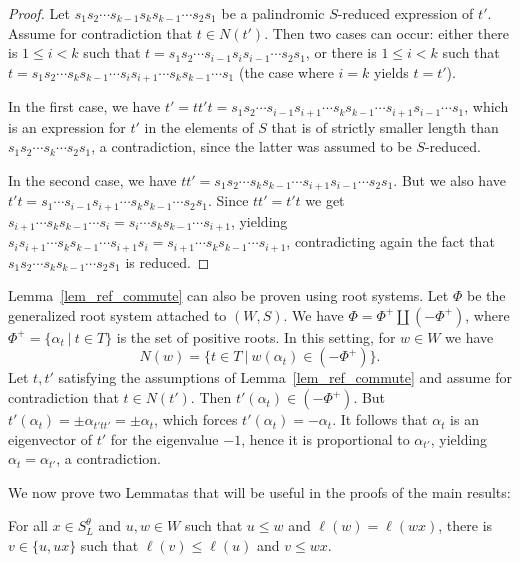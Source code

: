 \documentclass[ALCO, Unicode]{cedram}
\begin{document}
\begin{proof}
	Let $s_1 s_2 \cdots s_{k-1} s_k s_{k-1}\cdots s_2 s_1$ be a palindromic $S$-reduced expression of $t'$. Assume for contradiction that $t\in N(t')$. Then two cases can occur: either there is $1\leq i < k$ such that $t=s_1 s_2 \cdots s_{i-1} s_i s_{i-1}\cdots s_2 s_1$, or there is $1 \leq i < k$ such that $t= s_1 s_2 \cdots s_k s_{k-1} \cdots s_i s_{i+1} \cdots s_k s_{k-1} \cdots s_1$ (the case where $i=k$ yields $t=t'$).
	
	In the first case, we have $t'=tt't= s_1 s_2 \cdots s_{i-1} s_{i+1} \cdots s_k s_{k-1} \cdots s_{i+1} s_{i-1} \cdots s_1$, which is an expression for $t'$ in the elements of $S$ that is of strictly smaller length than $s_1 s_2\cdots s_k \cdots s_2 s_1$, a contradiction, since the latter was assumed to be $S$-reduced. 
	
	In the second case, we have $tt'= s_1 s_2 \cdots s_k s_{k-1} \cdots s_{i+1} s_{i-1} \cdots s_2 s_1$. But we also have $t't= s_1 \cdots s_{i-1} s_{i+1}\cdots s_k s_{k-1} \cdots s_2 s_1$. Since $tt'=t't$ we get $s_{i+1} \cdots s_k s_{k-1} \cdots s_i = s_i \cdots s_k s_{k-1}\cdots s_{i+1}$, yielding $s_{i} s_{i+1} \cdots s_k s_{k-1} \cdots s_{i+1} s_i=s_{i+1} \cdots s_k s_{k-1} \cdots s_{i+1}$, contradicting again the fact that $s_1 s_2 \cdots s_k s_{k-1} \cdots s_2 s_1$ is reduced.  
\end{proof}
\begin{rema}
	Lemma~\ref{lem_ref_commute} can also be proven using root systems. Let $\Phi$ be the generalized root system attached to $(W,S)$. We have $\Phi=\Phi^+ \coprod (- \Phi^+)$, where $\Phi^+=\{\alpha_t~|~t\in T\}$ is the set of positive roots. In this setting, for $w\in W$ we have $$N(w)=\{t\in T~|~w(\alpha_t)\in(-\Phi^+)\}.$$ Let $t,t'$ satisfying the assumptions of Lemma~\ref{lem_ref_commute} and assume for contradiction that $t\in N(t')$. Then $t'(\alpha_t)\in(-\Phi^+)$. But $t'(\alpha_t)=\pm \alpha_{t'tt'}=\pm \alpha_{t}$, which forces $t'(\alpha_t)=-\alpha_t$. It follows that $\alpha_t$ is an eigenvector of $t'$ for the eigenvalue $-1$, hence it is proportional to $\alpha_{t'}$, yielding $\alpha_t=\alpha_{t'}$, a contradiction. 
\end{rema}

We now prove two Lemmatas that will be useful in the proofs of the main results: 

\begin{lemma}\label{lem_corr}
For all $x\in S_L^\theta$ and $u, w\in W$ such that $u \leq w$ and $\ell(w)=\ell(wx)$, there is $v\in \{u, ux\}$ such that $\ell(v)\leq \ell(u)$ and $v \leq wx$. 
\end{lemma}
\end{document}
